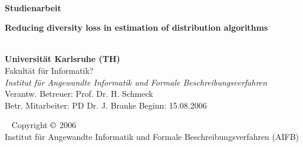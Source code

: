 \usepackage{epsf,amsthm,amsmath}
\usepackage[latin1]{inputenc}
\usepackage{graphicx}
\setlength{\parskip}{5pt plus 8pt minus 2pt}
\pagestyle{headings}

%
%
%


\begin{titlepage}
\ \vfill
\Large
\begin{center}
{\LARGE\bf Studienarbeit} \\[1cm]
{\huge\bf Reducing diversity loss in estimation of distribution algorithms\par}
\vspace*{1cm}

\\[1cm]
{\bf Universit\"at Karlsruhe (TH)}\\
{Fakult\"at f\"ur Informatik?}\\
{\em Institut f\"ur Angewandte Informatik und Formale Beschreibungsverfahren}
\vfill
Verantw. Betreuer: Prof. Dr. H. Schmeck\\
Betr. Mitarbeiter: PD Dr. J. Branke
\vfill\vfill 
Beginn: 15.08.2006
\vfill
\vfill
\end{center}
\end{titlepage} 
% 
\thispagestyle{empty}
\ 
\vfill
\noindent
Copyright $\copyright$ 2006\\
Institut f\"ur Angewandte Informatik und Formale Beschreibungsverfahren (AIFB)\\
 
